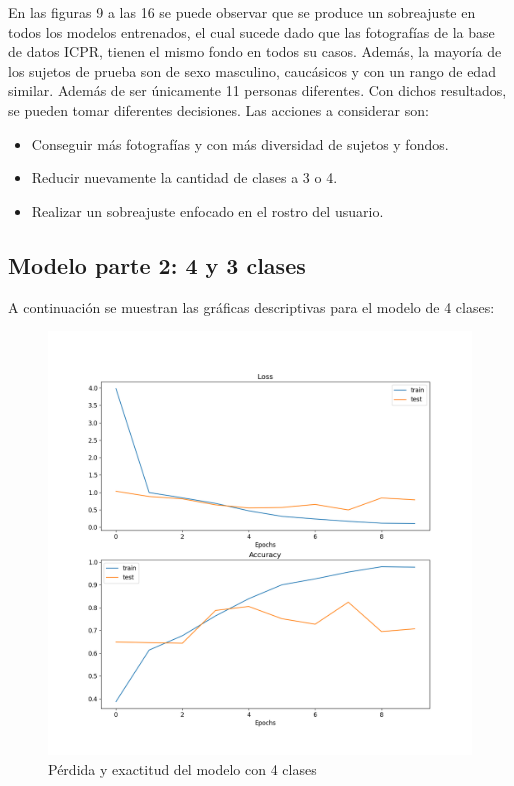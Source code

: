 En las figuras 9 a las 16 se puede observar que se produce un sobreajuste en todos los modelos entrenados, el cual sucede dado que las fotografías de la base de datos ICPR, tienen el mismo fondo en todos su casos. Además, la mayoría de los sujetos de prueba son de sexo masculino, caucásicos y con un rango de edad similar. Además de ser únicamente 11 personas diferentes. Con dichos resultados, se pueden tomar diferentes decisiones. Las acciones a considerar son: 

\begin{itemize}
	\item Conseguir más fotografías y con más diversidad de sujetos y fondos.
	\item Reducir nuevamente la cantidad de clases a 3 o 4. 
	\item Realizar un sobreajuste enfocado en el rostro del usuario.
\end{itemize}

\subsection{Modelo parte 2: 4 y 3 clases}

A continuación se muestran las gráficas descriptivas para el modelo de 4 clases:

\begin{figure}[H]
	\centering
	\includegraphics[scale=0.65]{figures/LA4.png}
	\caption{Pérdida y exactitud del modelo con 4 clases}
	\label{fig:img17}
\end{figure}

